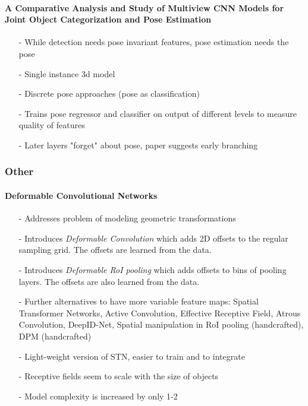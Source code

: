 \documentclass{article}
\begin{document}
	 	\paragraph{A Comparative Analysis and Study of Multiview CNN Models for Joint Object Categorization and Pose Estimation\cite{Elhoseiny}}
	 	\begin{itemize}
	 		\item[-] While detection needs pose invariant features, pose estimation needs the pose
		 	\item[-] Single instance 3d model
		 	\item[-] Discrete pose approaches (pose as classification)
		 	\item[-] Trains pose regressor and classifier on output of different levels to measure quality of features
		 	\item[-] Later layers "forget" about pose, paper suggests early branching
	 	\end{itemize}
	\subsubsection{Other}
		 \paragraph{Deformable Convolutional Networks \cite{Dai}}
		 \begin{itemize}
		 	\item[-] Addresses problem of modeling geometric transformations
		 	\item[-] Introduces \textit{Deformable Convolution} which adds 2D offsets to the regular sampling grid. The offsets are learned from the data.
		 	\item[-] Introduces \textit{Deformable RoI pooling} which adds offsets to bins of pooling layers. The offsets are also learned from the data.
		 	\item[-] Further alternatives to have more variable feature maps: Spatial Transformer Networks, Active Convolution, Effective Receptive Field, Atrous Convolution, DeepID-Net, Spatial manipulation in RoI pooling (handcrafted), DPM (handcrafted)
		 	\item[-] Light-weight version of STN, easier to train and to integrate
		 	\item[-] Receptive fields seem to scale with the size of objects
		 	\item[-] Model complexity is increased by only 1-2%
		 	\end{itemize}
		 	
\end{document}
